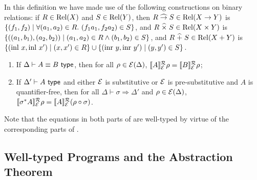 In this definition we have made use of the following %
constructions on binary relations: if $R \in \mathrm{Rel}(X)$ and $S \in
\mathrm{Rel}(Y)$, then $R \mathrel{\widehat\to} S \in \mathrm{Rel}(X \to Y)$ is %
$\{(f_1,f_2) \mathrel| \forall (a_1,a_2) \in R.\ (f_1a_1,f_2a_2) \in S
\}$, and %
$R
\mathrel{\widehat\times} S \in \mathrm{Rel}(X \times Y)$ is %
$\{((a_1,b_1),(a_2,b_2)) \mathrel| (a_1,a_2) \in R \land (b_1,b_2) \in S
\}$, and %
$R \mathrel{\widehat+} S \in \mathrm{Rel}(X + Y)$ is %
$\{ (\mathrm{inl}\ x, \mathrm{inl}\ x') \mathrel| (x,x') \in R \} \cup
\{ (\mathrm{inr}\ y, \mathrm{inr}\ y') \mathrel| (y,y') \in S \}$.

\begin{lemma}\label{lem:tyeqsubst-relational}
  \begin{enumerate}
  \item If $\Delta \vdash A \equiv B \textsf{ type}$, then for all $\rho \in
    \mathcal{E}(\Delta)$, $\llbracket A \rrbracket^{\mathcal{R}}_{\mathcal{E}}{\rho} =
    \llbracket B \rrbracket^{\mathcal{R}}_{\mathcal{E}}{\rho}$;
  \item If $\Delta' \vdash A \textsf{ type}$ and either $\mathcal{E}$ is
    substitutive or $\mathcal{E}$ is pre-substitutive and $A$ is
    quantifier-free, then for all $\Delta \vdash \sigma \Rightarrow
    \Delta'$ and $\rho \in \mathcal{E}(\Delta)$,
    $\llbracket \sigma^*A \rrbracket^{\mathcal{R}}_{\mathcal{E}}{\rho} = \llbracket A \rrbracket^{\mathcal{R}}_{\mathcal{E}}{(}\rho
    \circ \sigma)$.
  \end{enumerate}
\end{lemma}
\noindent
Note that the equations in both parts of
 are well-typed by virtue of the
corresponding parts of .


\subsection{Well-typed Programs and the Abstraction Theorem}
\label{sec:well-typed-programs}

